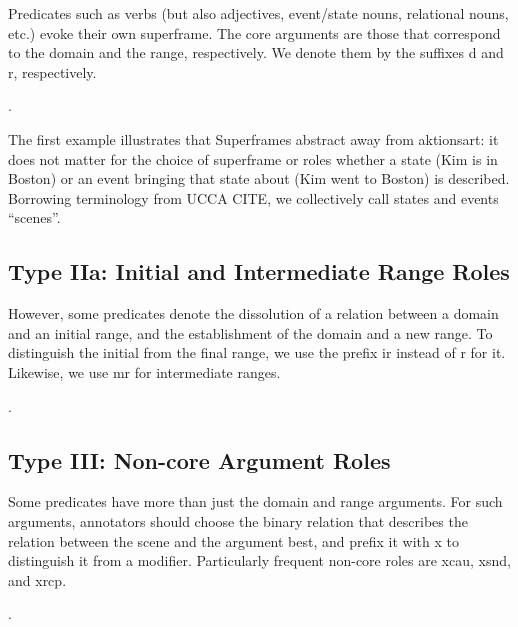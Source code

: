 \documentclass[a4paper]{article}
\begin{document}
Predicates such as verbs (but also adjectives, event/state nouns, relational nouns, etc.) evoke their own superframe. The core arguments are those that correspond to the domain and the range, respectively. We denote them by the suffixes \textsf{d} and \textsf{r}, respectively.

\ex. 

The first example illustrates that Superframes abstract away from aktionsart: it does not matter for the choice of superframe or roles whether a state (Kim is in Boston) or an event bringing that state about (Kim went to Boston) is described. Borrowing terminology from UCCA CITE, we collectively call states and events ``scenes''.

\subsection{Type IIa: Initial and Intermediate Range Roles}

However, some predicates denote the dissolution of a relation between a domain and an initial range, and the establishment of the domain and a new range. To distinguish the initial from the final range, we use the prefix \textsf{ir} instead of \textsf{r} for it. Likewise, we use \textsf{mr} for intermediate ranges.

\ex. \\

\subsection{Type III: Non-core Argument Roles}

Some predicates have more than just the domain and range arguments. For such arguments, annotators should choose the binary relation that describes the relation between the scene and the argument best, and prefix it with \textsf{x} to distinguish it from a modifier. Particularly frequent non-core roles are \textsf{xcau}, \textsf{xsnd}, and \textsf{xrcp}.

\ex. 
     \\
\end{document}

